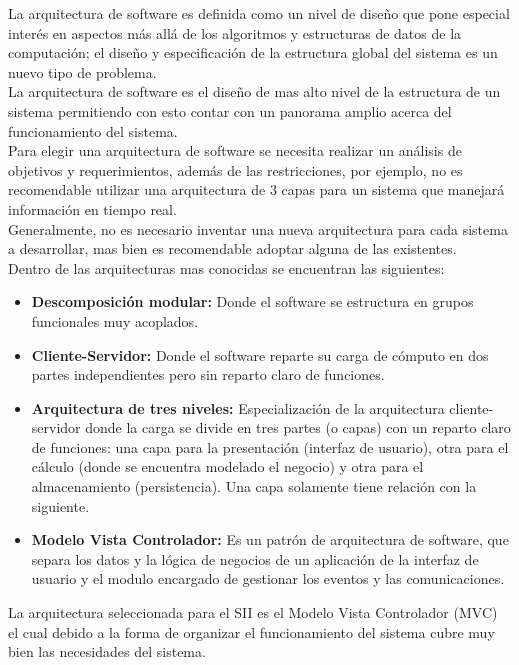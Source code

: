 	La arquitectura de software es definida como un nivel de dise\~no que pone especial inter\'es en aspectos m\'as all\'a de  los algoritmos y estructuras de datos de la computaci\'on; el dise\~no y especificaci\'on de la estructura global del sistema es un nuevo tipo de problema.\\

	La arquitectura de software es el dise\~no de mas alto nivel  de la estructura de un sistema permitiendo con esto contar con un panorama amplio acerca del funcionamiento del sistema.\\

	Para elegir una arquitectura de software se necesita realizar un an\'alisis de objetivos y requerimientos, adem\'as de las restricciones, por ejemplo, no es recomendable utilizar una arquitectura de 3 capas para un sistema que manejar\'a informaci\'on en tiempo real.\\

	Generalmente, no es necesario inventar una nueva arquitectura para cada sistema a desarrollar, mas bien es recomendable adoptar alguna de las existentes.\\

	Dentro de las arquitecturas mas conocidas se encuentran las siguientes:\\
	\begin{itemize}
		\item \textbf{Descomposici\'on modular:} Donde el software se estructura en grupos funcionales muy acoplados.
		\item \textbf{Cliente-Servidor:} Donde el software reparte su carga de c\'omputo en dos partes independientes pero sin reparto claro de funciones.
		\item \textbf{Arquitectura de tres niveles:} Especializaci\'on de la arquitectura cliente-servidor donde la carga se divide en tres partes (o capas) con un reparto claro de funciones: una capa para la presentaci\'on (interfaz de usuario), otra para el c\'alculo (donde se encuentra modelado el negocio) y otra para el almacenamiento (persistencia). Una capa solamente tiene relaci\'on con la siguiente.
		\item \textbf{Modelo Vista Controlador:} Es un patr\'on de arquitectura de software, que separa  los datos y la l\'ogica de negocios de un aplicaci\'on de la interfaz de usuario y el modulo encargado de gestionar  los eventos y las comunicaciones.
	\end{itemize}

	La arquitectura seleccionada para el SII es el Modelo Vista Controlador (MVC) el cual debido a la forma de organizar el funcionamiento del sistema cubre muy bien las necesidades del sistema.
		
